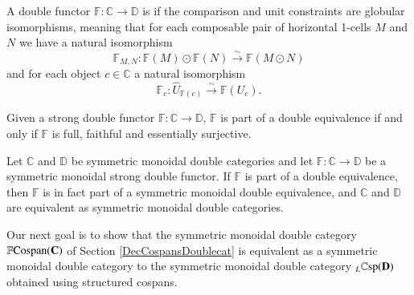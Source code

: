 \documentclass{amsart}
\begin{document}
\begin{defn}
A double functor $\mathbb{F} \colon \mathbb{C} \to \mathbb{D}$ is  if the comparison and unit constraints are globular isomorphisms, meaning that for each composable pair of horizontal 1-cells $M$ and $N$ we have a natural isomorphism $$\mathbb{F}_{M,N} \colon \mathbb{F}(M) \odot \mathbb{F}(N) \xrightarrow{\sim} \mathbb{F}(M \odot N)$$and for each object $c \in \mathbb{C}$ a natural isomorphism $$\mathbb{F}_c \colon \hat{U}_{\mathbb{F}(c)} \xrightarrow{\sim} \mathbb{F}(U_c).$$
\end{defn}
\begin{thm}[Shulman,7.8]\label{ShulDubEquiv}
Given a strong double functor $\mathbb{F} \colon \mathbb{C} \to \mathbb{D}$, $\mathbb{F}$ is part of a double equivalence if and only if $\mathbb{F}$ is full, faithful and essentially surjective.
\end{thm}
\begin{prop}
Let $\mathbb{C}$ and $\mathbb{D}$ be symmetric monoidal double categories and let $\mathbb{F} \colon \mathbb{C} \to \mathbb{D}$ be a symmetric monoidal strong double functor. If $\mathbb{F}$ is part of a double equivalence, then $\mathbb{F}$ is in fact part of a symmetric monoidal double equivalence, and $\mathbb{C}$ and $\mathbb{D}$ are equivalent as symmetric monoidal double categories.
\end{prop}
Our next goal is to show that the symmetric monoidal double category $\mathbb{F}\textnormal{Cospan}(\bold{C})$ of Section \ref{DecCospansDoublecat} is equivalent as a symmetric monoidal double category to the symmetric monoidal double category $_L \mathbb{C}\textnormal{sp}(\bold{D})$ obtained using structured cospans.
\end{document}
